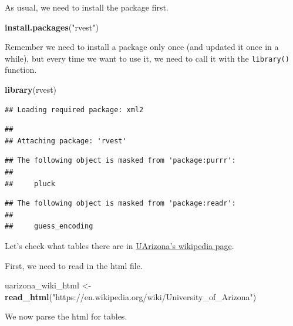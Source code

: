 \documentclass[
]{book}
\newenvironment{Shaded}{\begin{snugshade}}{\end{snugshade}}
\newcommand{\KeywordTok}[1]{\textcolor[rgb]{0.13,0.29,0.53}{\textbf{#1}}}
\newcommand{\NormalTok}[1]{#1}
\newcommand{\OperatorTok}[1]{\textcolor[rgb]{0.81,0.36,0.00}{\textbf{#1}}}
\newcommand{\StringTok}[1]{\textcolor[rgb]{0.31,0.60,0.02}{#1}}
\begin{document}
As usual, we need to install the package first.

\begin{Shaded}
\begin{Highlighting}[]
\KeywordTok{install.packages}\NormalTok{(}\StringTok{"rvest"}\NormalTok{)}
\end{Highlighting}
\end{Shaded}

Remember we need to install a package only once (and updated it once in a while), but every time we want to use it, we need to call it with the \texttt{library()} function.

\begin{Shaded}
\begin{Highlighting}[]
\KeywordTok{library}\NormalTok{(rvest)}
\end{Highlighting}
\end{Shaded}

\begin{verbatim}
## Loading required package: xml2
\end{verbatim}

\begin{verbatim}
## 
## Attaching package: 'rvest'
\end{verbatim}

\begin{verbatim}
## The following object is masked from 'package:purrr':
## 
##     pluck
\end{verbatim}

\begin{verbatim}
## The following object is masked from 'package:readr':
## 
##     guess_encoding
\end{verbatim}

Let's check what tables there are in \href{https://en.wikipedia.org/wiki/University_of_Arizona}{UArizona's wikipedia page}.

First, we need to read in the html file.

\begin{Shaded}
\begin{Highlighting}[]
\NormalTok{uarizona_wiki_html <-}\StringTok{ }\KeywordTok{read_html}\NormalTok{(}\StringTok{"https://en.wikipedia.org/wiki/University_of_Arizona"}\NormalTok{)}
\end{Highlighting}
\end{Shaded}

We now parse the html for tables.

\begin{Shaded}
\end{Shaded}
\end{document}
